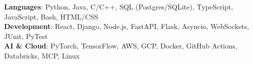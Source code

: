 \begin{itemize}[leftmargin=0.15in, label={}]
    \small{\item{
     \textbf{Languages}{: Python, Java, C/C++, SQL (Postgres/SQLite), TypeScript, JavaScript, Bash, HTML/CSS} \\
     \textbf{Development}{: React, Django, Node.js, FastAPI, Flask, Asyncio, WebSockets, JUnit, PyTest} \\
     \textbf{AI \& Cloud}{: PyTorch, TensorFlow, AWS, GCP, Docker, GitHub Actions, Databricks, MCP, Linux}
    }}
\end{itemize}
